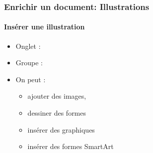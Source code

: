 \documentclass[xcolor=table]{beamer}
\begin{document}
\begin{frame}[t]
\frametitle{Enrichir un document: Illustrations}
\framesubtitle{Insérer une illustration}

\begin{minipage}{0.43\textwidth}
	\begin{itemize}
		\item Onglet : 
		\item Groupe : 
		\item On peut :
		\begin{itemize}
			\item ajouter des images,
			\item dessiner des formes
			\item insérer des graphiques
			\item insérer des formes SmartArt
		\end{itemize}
	\end{itemize}
\end{minipage}
\begin{minipage}{0.28\textwidth}
	
	
\end{minipage}
\begin{minipage}{0.27\textwidth}	
\end{minipage}

\end{frame}
\end{document}
